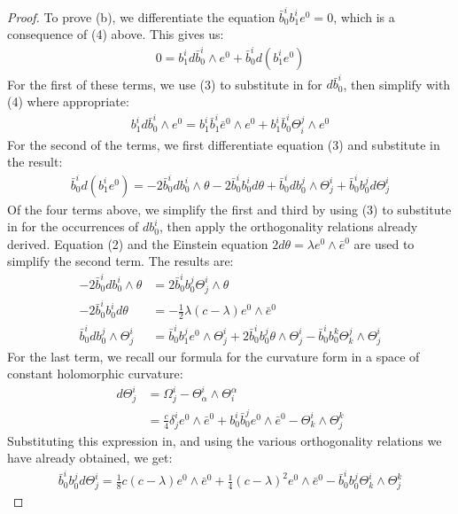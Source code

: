 \begin{proof}
To prove (b), we differentiate the equation $\bar{b}^i_0 b^i_1 e^0 = 0$, which is a consequence of (4) above.  This gives us:
%
\begin{align*}
0 = b^i_1 d \bar{b}^i_0 \wedge e^0 + \bar{b}^i_0 d( b^i_1 e^0 )
\end{align*}
%
For the first of these terms, we use (3) to substitute in for $d \bar{b}^i_0$, then simplify with (4) where appropriate:
%
\begin{align*}
b^i_1 d \bar{b}^i_0 \wedge e^0 = b^i_1 \bar{b}^i_1 \bar{e}^0 \wedge e^0 + b^i_1 \bar{b}^i_0 \Theta^j_i \wedge e^0
\end{align*}
%
For the second of the terms, we first differentiate equation (3) and substitute in the result:
%
\begin{align*}
\bar{b}^i_0 d( b^i_1 e^0 ) = -2 \bar{b}^i_0 d b^i_0 \wedge \theta - 2 \bar{b}^i_0 b^i_0 d \theta + \bar{b}^i_0 d b^j_0 \wedge \Theta^i_j + \bar{b}^i_0 b^j_0 d \Theta^i_j
\end{align*}
%
Of the four terms above, we simplify the first and third by using (3) to substitute in for the occurrences of $d b^i_0$, then apply the orthogonality relations already derived. Equation (2) and the Einstein equation $2 d \theta = \lambda e^0 \wedge \bar{e}^0$ are used to simplify the second term.  The results are:
%
\begin{align*}
-2 \bar{b}^i_0 d b^i_0 \wedge \theta &= 2 \bar{b}^i_0 b^j_0 \Theta^i_j \wedge \theta \\
-2 \bar{b}^i_0 b^i_0 d \theta &= - \frac{1}{2} \lambda ( c - \lambda ) e^0 \wedge \bar{e}^0 \\
\bar{b}^i_0 d b^j_0 \wedge \Theta^i_j &= \bar{b}^i_0 b^j_1 e^0 \wedge \Theta^i_j + 2 \bar{b}^i_0 b^j_0  \theta \wedge \Theta^i_j - \bar{b}^i_0 b^k_0 \Theta^j_k \wedge \Theta^i_j
\end{align*}
%
For the last term, we recall our formula for the curvature form in a space of constant holomorphic curvature:
%
\begin{align*}
d \Theta^i_j &= \Omega^i_j - \Theta^i_{\alpha} \wedge \Theta^{\alpha}_i \\
&= \frac{c}{4} \delta^i_j e^0 \wedge \bar{e}^0 + b^i_0 \bar{b}^j_0 e^0 \wedge \bar{e}^0 - \Theta^i_k \wedge \Theta^k_j
\end{align*}
%
Substituting this expression in, and using the various orthogonality relations we have already obtained, we get:
%
\begin{align*}
\bar{b}^i_0 b^j_0 d \Theta^i_j = \frac{1}{8} c (c- \lambda) e^0 \wedge \bar{e}^0 + \frac{1}{4} (c - \lambda)^2 e^0 \wedge \bar{e}^0 - \bar{b}^i_0 b^j_0 \Theta^i_k \wedge \Theta^k_j

\end{align*}
\end{proof}
